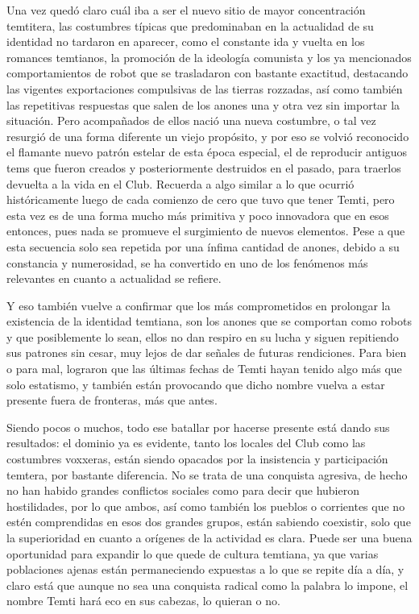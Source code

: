 \documentclass[
  spanish,
]{book}
\begin{document}
Una vez quedó claro cuál iba a ser el nuevo sitio de mayor concentración temtitera, las costumbres típicas que predominaban en la actualidad de su identidad no tardaron en aparecer, como el constante ida y vuelta en los romances temtianos, la promoción de la ideología comunista y los ya mencionados comportamientos de robot que se trasladaron con bastante exactitud, destacando las vigentes exportaciones compulsivas de las tierras rozzadas, así como también las repetitivas respuestas que salen de los anones una y otra vez sin importar la situación.
Pero acompañados de ellos nació una nueva costumbre, o tal vez resurgió de una forma diferente un viejo propósito, y por eso se volvió reconocido el flamante nuevo patrón estelar de esta época especial, el de reproducir antiguos tems que fueron creados y posteriormente destruidos en el pasado, para traerlos devuelta a la vida en el Club. Recuerda a algo similar a lo que ocurrió históricamente luego de cada comienzo de cero que tuvo que tener Temti, pero esta vez es de una forma mucho más primitiva y poco innovadora que en esos entonces, pues nada se promueve el surgimiento de nuevos elementos. Pese a que esta secuencia solo sea repetida por una ínfima cantidad de anones, debido a su constancia y numerosidad, se ha convertido en uno de los fenómenos más relevantes en cuanto a actualidad se refiere.

Y eso también vuelve a confirmar que los más comprometidos en prolongar la existencia de la identidad temtiana, son los anones que se comportan como robots y que posiblemente lo sean, ellos no dan respiro en su lucha y siguen repitiendo sus patrones sin cesar, muy lejos de dar señales de futuras rendiciones. Para bien o para mal, lograron que las últimas fechas de Temti hayan tenido algo más que solo estatismo, y también están provocando que dicho nombre vuelva a estar presente fuera de fronteras, más que antes.

Siendo pocos o muchos, todo ese batallar por hacerse presente está dando sus resultados: el dominio ya es evidente, tanto los locales del Club como las costumbres voxxeras, están siendo opacados por la insistencia y participación temtera, por bastante diferencia. No se trata de una conquista agresiva, de hecho no han habido grandes conflictos sociales como para decir que hubieron hostilidades, por lo que ambos, así como también los pueblos o corrientes que no estén comprendidas en esos dos grandes grupos, están sabiendo coexistir, solo que la superioridad en cuanto a orígenes de la actividad es clara. Puede ser una buena oportunidad para expandir lo que quede de cultura temtiana, ya que varias poblaciones ajenas están permaneciendo expuestas a lo que se repite día a día, y claro está que aunque no sea una conquista radical como la palabra lo impone, el nombre Temti hará eco en sus cabezas, lo quieran o no.
\end{document}
